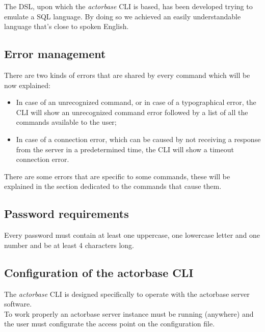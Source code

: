 \documentclass{scalatekids-article}
\begin{document}
The DSL, upon which the \textit{actorbase} CLI is based, has been developed
trying to emulate a SQL language. By doing so we achieved an easily
understandable language that's close to spoken English.

\subsection{Error management}

There are two kinds of errors that are shared by every command which will be
now explained:
\begin{itemize}
\item In case of an unrecognized command, or in case of a typographical error,
	the CLI will show an unrecognized command error followed by a list of all
	the commands available to the user;
\item In case of a connection error, which can be caused by not receiving a
	response from the server in a predetermined time, the CLI will show a
	timeout connection error.
\end{itemize}
There are some errors that are specific to some commands, these will be explained
in the section dedicated to the commands that cause them.


\subsection{Password requirements}
\label{sec:passwordrequirement}
Every password must contain at least one uppercase, one lowercase letter and one
number and be at least 4 characters long.

\subsection{Configuration of the actorbase CLI}
\label{sec:configurationcli}
The \textit{actorbase} CLI is designed specifically to operate 
with the actorbase server software.\\
To work properly an actorbase server instance must be running 
(anywhere) and the user must configurate the access point on the configuration file.
\end{document}
